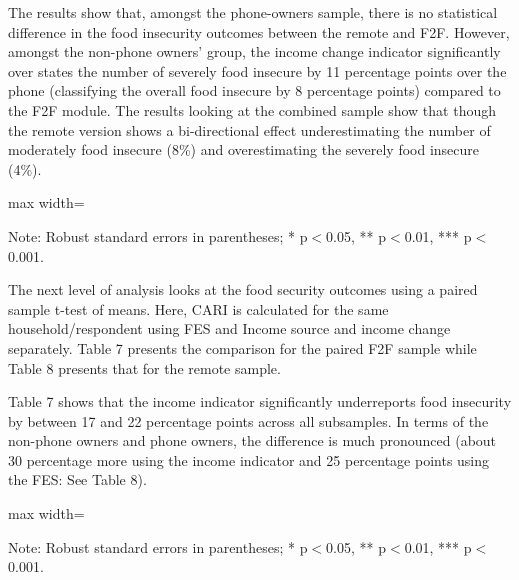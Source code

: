 \documentclass[11pt,harvard]{article}
\begin{document}
The results show that, amongst the phone-owners sample, there is no statistical difference in the food insecurity outcomes between the remote and F2F. However, amongst the non-phone owners' group, the income change indicator significantly over states the number of severely food insecure by 11 percentage points over the phone (classifying the overall food insecure by 8 percentage points) compared to the F2F module. The results looking at the combined sample show that though the remote version shows a bi-directional effect underestimating the number of moderately food insecure (8\%) and overestimating the severely food insecure (4\%).
		
	\begin{table}[htbp]
		\centering
		\begin{adjustbox}{max width=\textwidth}
			\begin{threeparttable}
				\caption{Impact of Survey Modality: CARI-Inc vs. rCARI-Inc}
				\scriptsize
				 
				\label{tab:Inc_CARI_rCARI_Modality_CAR}
				\begin{tablenotes}
					\item Note: Robust standard errors in parentheses; * p$<$0.05, ** p$<$0.01, *** p$<$0.001. 
				\end{tablenotes}
			\end{threeparttable}
		\end{adjustbox}
	\end{table}


The next level of analysis looks at the food security outcomes using a paired sample t-test of means. Here, CARI is calculated for the same household/respondent using FES and Income source and income change separately. Table 7 presents the comparison for the paired F2F sample while Table 8 presents that for the remote sample.

Table 7 shows that the income indicator significantly underreports food insecurity by between 17 and 22 percentage points across all subsamples. In terms of the non-phone owners and phone owners, the difference is much pronounced (about 30 percentage more using the income indicator and 25 percentage points using the FES: See Table 8).


\begin{table}[htbp]
	\centering
	\begin{adjustbox}{max width=\textwidth}
		\begin{threeparttable}
			\caption{Impact of Indicator Composition: CARI-FES vs. CARI-Inc in F2F Surveys (Paired)}
			\scriptsize
			 
			\label{tab:CAR_F2F_Paired_ttest_Full}
			\begin{tablenotes}
				\item Note: Robust standard errors in parentheses; * p$<$0.05, ** p$<$0.01, *** p$<$0.001.
			\end{tablenotes}
		\end{threeparttable}
	\end{adjustbox}
\end{table}
\end{document}
